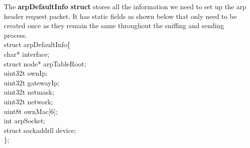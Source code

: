\documentclass{uathesis}
\begin{document}
\begin{appendices}
The \textbf{arpDefaultInfo struct} stores all the information we need to set up the arp header request packet. It has static fields as shown below that only need to be created once as they remain the same throughout the sniffing and sending process.\\

\noindent struct arpDefaultInfo\big\{\\
\hphantom{structarp} char* \hphantom{htyttttth.} interface;\\
\hphantom{structarp} struct node*\hphantom{hi,} arpTableRoot; \\
\hphantom{structarp} uint32\textunderscore t\hphantom{hty6A} ownIp; \\
\hphantom{structarp} uint32\textunderscore t\hphantom{hty6A} gatewayIp; \\
\hphantom{structarp} uint32\textunderscore t\hphantom{hty6A} netmask;\\
\hphantom{structarp} uint32\textunderscore t\hphantom{hty6A} network;\\
\hphantom{structarp} uint8\textunderscore t\hphantom{hty6Ao} ownMac[6];\\
\hphantom{structarp} int\hphantom{hty6AAAar} arpSocket;\\
\hphantom{structarp} struct\hphantom{hty6sock} sockaddr\textunderscore ll device;\\
\indent\big\};\\


\end{appendices}
\end{document}
